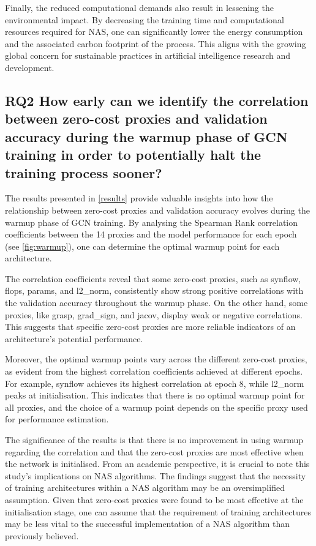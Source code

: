 Finally, the reduced computational demands also result in lessening the environmental impact. By decreasing the training time and computational resources required for NAS, one can significantly lower the energy consumption and the associated carbon footprint of the process. This aligns with the growing global concern for sustainable practices in artificial intelligence research and development.


\subsection{RQ2 How early can we identify the correlation between zero-cost proxies and validation accuracy during the warmup phase of GCN training in order to potentially halt the training process sooner?}

The results presented in \cref{results} provide valuable insights into how the relationship between zero-cost proxies and validation accuracy evolves during the warmup phase of GCN training. By analysing the Spearman Rank correlation coefficients between the 14 proxies and the model performance for each epoch (see \cref{fig:warmup}), one can determine the optimal warmup point for each architecture.

The correlation coefficients reveal that some zero-cost proxies, such as synflow, flops, params, and l2\_norm, consistently show strong positive correlations with the validation accuracy throughout the warmup phase. On the other hand, some proxies, like grasp, grad\_sign, and jacov, display weak or negative correlations. This suggests that specific zero-cost proxies are more reliable indicators of an architecture's potential performance.

Moreover, the optimal warmup points vary across the different zero-cost proxies, as evident from the highest correlation coefficients achieved at different epochs. For example, synflow achieves its highest correlation at epoch 8, while l2\_norm peaks at initialisation. This indicates that there is no optimal warmup point for all proxies, and the choice of a warmup point depends on the specific proxy used for performance estimation.

The significance of the results is that there is no improvement in using warmup regarding the correlation and that the zero-cost proxies are most effective when the network is initialised. From an academic perspective, it is crucial to note this study's implications on NAS algorithms. The findings suggest that the necessity of training architectures within a NAS algorithm may be an oversimplified assumption. Given that zero-cost proxies were found to be most effective at the initialisation stage, one can assume that the requirement of training architectures may be less vital to the successful implementation of a NAS algorithm than previously believed.

